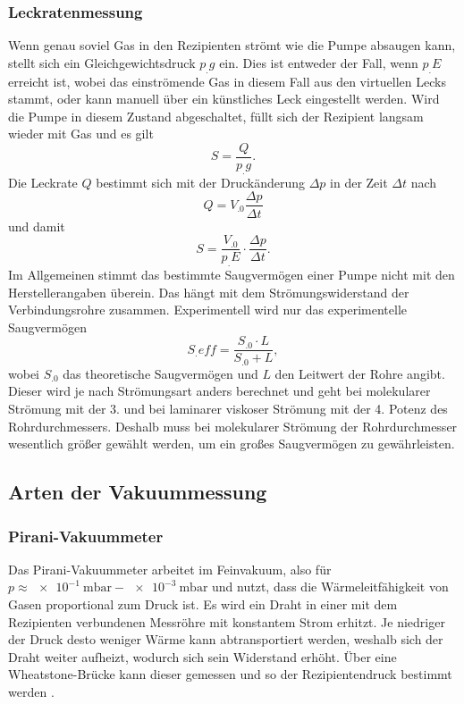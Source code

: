 \subsubsection{Leckratenmessung}

Wenn genau soviel Gas in den Rezipienten strömt wie die Pumpe absaugen kann, stellt sich ein Gleichgewichtsdruck $p_.g$ ein. Dies ist entweder der Fall, wenn $p_.E$ erreicht ist, wobei das einströmende Gas in diesem Fall aus den virtuellen Lecks stammt, oder kann manuell über ein künstliches Leck eingestellt werden. \newline 
Wird die Pumpe in diesem Zustand abgeschaltet, füllt sich der Rezipient langsam wieder mit Gas und es gilt 
\[
S=\frac{Q}{p_.g}\text{.}
\]
Die Leckrate $Q$ bestimmt sich mit der Druckänderung $\Delta p$ in der Zeit $\Delta t$ nach
\[
Q=V_.0\frac{\Delta p}{\Delta t}
\]
und damit
\begin{equation}
S=\frac{V_.0}{p_.E}\cdot\frac{\Delta p}{\Delta t}\text{.}\label{eq:S}
\end{equation}
\newline\newline
Im Allgemeinen stimmt das bestimmte Saugvermögen einer Pumpe nicht mit den Herstellerangaben überein.
Das hängt mit dem Strömungswiderstand der Verbindungsrohre zusammen.
Experimentell wird nur das experimentelle Saugvermögen
\begin{equation}
S_.{eff}=\frac{S_.0\cdot L}{S_.0+L},
\end{equation}
wobei $S_.0$ das theoretische Saugvermögen und $L$ den Leitwert der Rohre angibt.
Dieser wird je nach Strömungsart anders berechnet und geht bei molekularer Strömung mit der 3. und bei laminarer viskoser Strömung mit der 4. Potenz des Rohrdurchmessers.
Deshalb muss bei molekularer Strömung der Rohrdurchmesser wesentlich größer gewählt werden, um ein großes Saugvermögen zu gewährleisten.

\subsection{Arten der Vakuummessung}

\subsubsection{Pirani-Vakuummeter}

Das Pirani-Vakuummeter arbeitet im Feinvakuum, also für $p\approx \SI{e-1}{\milli\bar} - \SI{e-3}{\milli\bar}$ und nutzt, dass die Wärmeleitfähigkeit von Gasen proportional zum Druck ist. Es wird ein Draht in einer mit dem Rezipienten verbundenen Messröhre mit konstantem Strom erhitzt. Je niedriger der Druck desto weniger Wärme kann abtransportiert werden, weshalb sich der Draht weiter aufheizt, wodurch sich sein Widerstand erhöht. Über eine Wheatstone-Brücke kann dieser gemessen und so der Rezipientendruck bestimmt werden \cite{Jena}.

